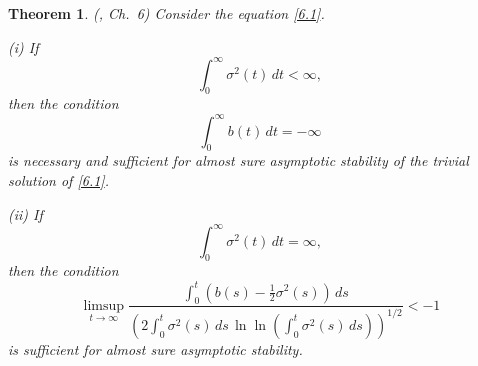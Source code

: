 \documentclass[a4paper,12pt]{article}
\newtheorem{theorem}[definition]{Theorem}
\numberwithin{equation}{section}
\begin{document}
\begin{theorem}(\cite{Khas}, Ch.~6) \label{Th:6.1.1}
Consider the equation \eqref{6.1}.

\medskip
\noindent
(i) If
\[
\int_0^\infty \sigma^2(t)\,dt < \infty,
\]
then the condition
\[
\int_0^\infty b(t)\,dt = -\infty
\]
is necessary and sufficient for almost sure asymptotic stability of the trivial solution of \eqref{6.1}.

\medskip
\noindent
(ii) If
\[
\int_0^\infty \sigma^2(t)\,dt = \infty,
\]
then the condition
\begin{equation}
\limsup_{t\to\infty}
\frac{\displaystyle \int_0^t \left(b(s)-\frac12\sigma^2(s)\right)\,ds}
{\displaystyle \left(2\int_0^t \sigma^2(s)\,ds \,
\ln\ln\!\left(\int_0^t \sigma^2(s)\,ds\right)\right)^{1/2}}
< -1
\label{ast*ast}
\end{equation}
is sufficient for almost sure asymptotic stability.
\end{theorem}

\bigskip
\end{document}
